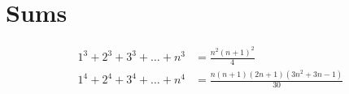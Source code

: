 %
%




\section{Sums}
\begin{align*}
	1^3 + 2^3 + 3^3 + \dots + n^3 &= \frac{n^2(n+1)^2}{4} \\
	1^4 + 2^4 + 3^4 + \dots + n^4 &= \frac{n(n+1)(2n+1)(3n^2 + 3n - 1)}{30} \\
\end{align*}

